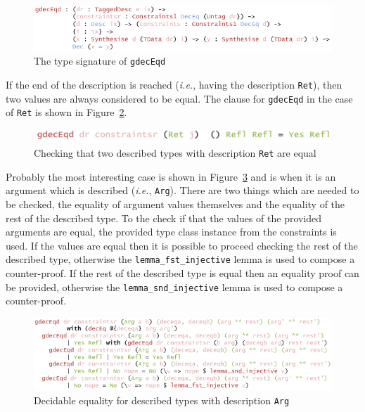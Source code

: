 \documentclass{ituthesis}
\newcommand{\ttconstructor}[1]{\textcolor{constructor-color}{\texttt{#1}}}
\newcommand{\ttdec}[1]{\textcolor{declared-var-color}{\texttt{#1}}}
\theoremstyle{break}
\begin{document}
\begin{figure}[ht]
\begin{center}
    \includegraphics[scale=0.5]{Figures/GenericDecEqDescType.png}
\end{center}
\caption{The type signature of \ttdec{gdecEqd}}
\label{fig:deceqgendescty}
\end{figure}

If the end of the description is reached (\textit{i.e.}, having the description \ttconstructor{Ret}), then two values are always considered to be equal.
The clause for \ttdec{gdecEqd} in the case of \ttconstructor{Ret} is shown in Figure~\ref{fig:deceqgendesc1}.

\begin{figure}[ht]
\begin{center}
    \includegraphics[scale=0.5]{Figures/GenericDecEqDesc1.png}
\end{center}
\caption{Checking that two described types with description \ttconstructor{Ret} are equal}
\label{fig:deceqgendesc1}
\end{figure}

Probably the most interesting case is shown in Figure~\ref{fig:deceqgendesc2} and is when it is an argument which is described (\textit{i.e.}, \ttconstructor{Arg}).
There are two things which are needed to be checked, the equality of argument values themselves and the equality of the rest of the described type.
To the check if that the values of the provided arguments are equal, the provided type class instance from the constraints is used.
If the values are equal then it is possible to proceed checking the rest of the described type, otherwise the \ttdec{lemma\_fst\_injective} lemma is used to compose a counter-proof.
If the rest of the described type is equal then an equality proof can be provided, otherwise the \ttdec{lemma\_snd\_injective} lemma is used to compose a counter-proof.

\begin{figure}[ht]
\begin{center}
    \includegraphics[scale=0.5]{Figures/GenericDecEqDesc2.png}
\end{center}
\caption{Decidable equality for described types with description \ttconstructor{Arg}}
\label{fig:deceqgendesc2}
\end{figure}
\end{document}
